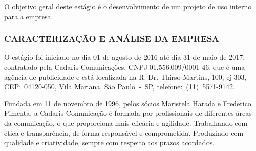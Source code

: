 \documentclass[
  12pt,            %
  openany,
  oneside,
  a4paper,         %
  english,      %
  brazil
]{article}
\numberwithin{figure}{section}
\numberwithin{table}{section}
\begin{document}
O objetivo geral deste estágio é o desenvolvimento de um projeto de uso interno para a empresa.


\subsubsection{CARACTERIZAÇÃO E ANÁLISE DA EMPRESA}




O estágio foi iniciado no dia 01 de agosto de 2016 até dia 31 de maio de 2017, contratado pela Cadaris Comunicações, CNPJ 01.556.009/0001-46, que é uma agência de publicidade e está localizada na R. Dr. Thirso Martins, 100, cj 303, CEP:~04120-050, Vila Mariana, São Paulo~-~SP, telefone:~(11)~5571-9142.

Fundada em 11 de novembro de 1996, pelos sócios Maristela Harada e Frederico Pimenta, a Cadaris Comunicação é formada por profissionais de diferentes áreas da comunicação, o que proporciona mais eficácia e agilidade. Trabalhando com ética e transparência, de forma responsável e comprometida. Produzindo com qualidade e criatividade, sempre com respeito aos prazos acordados.
\end{document}
